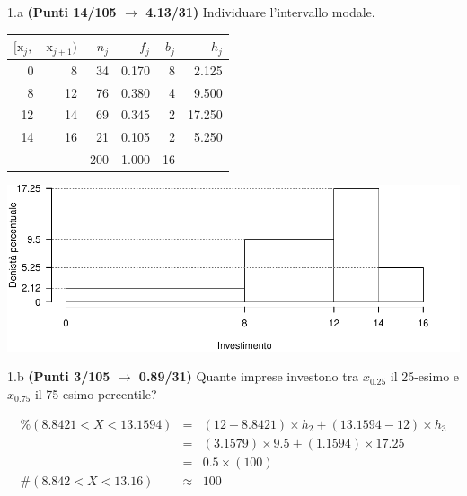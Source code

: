 \documentclass[
  11pt,
]{book}
\theoremstyle{mytheoremstyle}
\theoremstyle{mydefstyle}
\newenvironment{sol}
  {
  \begin{tcolorbox}[enhanced,breakable,arc=0.1mm,boxrule=1pt,colback=white,colframe=iblue,
  title=\bf \fontfamily{lmss}\selectfont \hspace{.5 cm} Soluzione,drop fuzzy shadow]

}{
\end{tcolorbox}
  }
\begin{document}
1.a \textbf{(Punti 14/105 \(\rightarrow\) 4.13/31)} Individuare l'intervallo modale.

\begin{sol}

\begin{table}[H]
\centering
\begin{tabular}{rrrrrr}
\toprule
$[\text{x}_j,$ & $\text{x}_{j+1})$ & $n_j$ & $f_j$ & $b_j$ & $h_j$\\
\midrule
0 & 8 & 34 & 0.170 & 8 & 2.125\\
8 & 12 & 76 & 0.380 & 4 & 9.500\\
12 & 14 & 69 & 0.345 & 2 & 17.250\\
14 & 16 & 21 & 0.105 & 2 & 5.250\\
 &  & 200 & 1.000 & 16 & \\
\bottomrule
\end{tabular}
\end{table}

\begin{center}\includegraphics{Esami_passati_con_soluzioni_files/figure-latex/2024-116-1} \end{center}

\end{sol}

1.b \textbf{(Punti 3/105 \(\rightarrow\) 0.89/31)} Quante imprese investono tra \(x_{0.25}\) il 25-esimo e \(x_{0.75}\) il 75-esimo percentile?

\begin{sol}
\begin{eqnarray*} \%(8.8421<X<13.1594) &=& (12-8.8421)\times h_{2}+  (13.1594-12)\times h_{3}  \\ 
 &=& (3.1579)\times 9.5+  (1.1594)\times 17.25  \\ 
 &=&  0.5 \times(100)\\
     \#( 8.842 < X < 13.16 ) &\approx& 100 
         \end{eqnarray*}

\end{sol}
\end{document}
